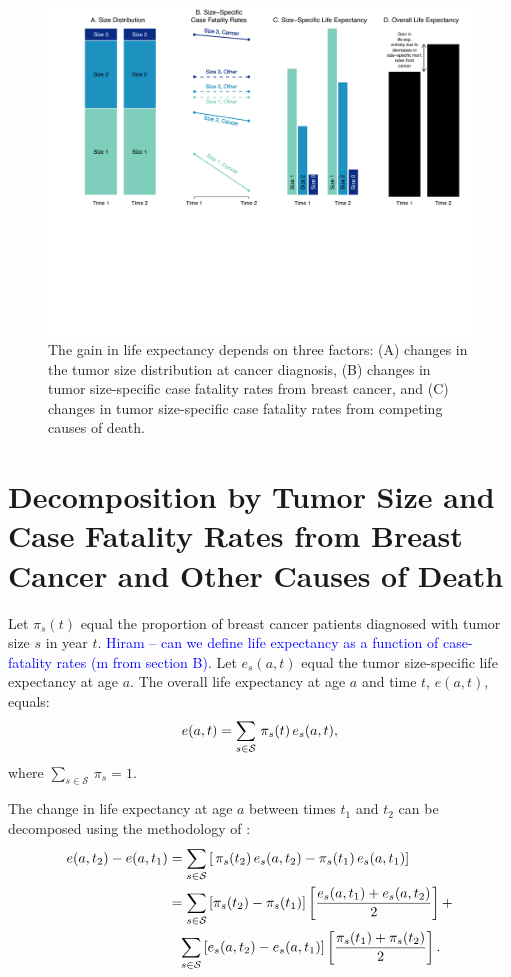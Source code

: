 \documentclass[11pt,letterpaper]{article}
\theoremstyle{plain}
\theoremstyle{remark}
\numberwithin{equation}{section}
\begin{document}
\begin{figure}[h]
\begin{center}
\includegraphics[trim=0 220 0 0,clip,width=\linewidth]{appendix_figure1}
\caption{The gain in life expectancy depends
  on three factors: (A) changes in the tumor size distribution at
  cancer diagnosis, (B) changes in tumor size-specific case fatality rates from
  breast cancer, and (C) changes in tumor size-specific case fatality rates from
  competing causes of death.}
\label{fig:simple_case}
\end{center}
\end{figure}

\section{Decomposition by Tumor Size and Case Fatality Rates from
  Breast Cancer and Other Causes of Death}
Let $\pi_s(t)$ equal the proportion of breast cancer patients
diagnosed with tumor size $s$ in year $t$.  \textcolor{blue}{Hiram --
  can we define life expectancy as a function of case-fatality rates
  (m from section B)}.  Let $e_s(a,t)$ equal the
tumor size-specific life expectancy at age $a$. The overall life
expectancy at age $a$ and time $t$, $e(a,t)$, equals:
\begin{eqnarray}
  e(a,t)=\sum_{s\in\mathcal{S}}\,\pi_s(t)\,e_s(a,t), \notag
\end{eqnarray}
where $\sum_{s\in\mathcal{S}}\,\pi_s=1$. 

The change in life expectancy at age $a$ between times $t_1$ and $t_2$
can be decomposed using the methodology of \cite{Kitagawa55}:
\begin{align}
  e(a,t_2)-e(a,t_1)&=\sum_{s\in\mathcal{S}}\left[\,\pi_s(t_2)\,e_s(a,t_2)- \pi_s(t_1)\,e_s(a,t_1)\right]  \notag\\
  \hspace{-0.7in} &=\sum_{s\in\mathcal{S}}\left[\pi_s(t_2)-\pi_s(t_1)
  \right]\left[\frac{e_s(a,t_1)+e_s(a,t_2)}{2}\right]+ \notag\\
  &\phantom{=}\sum_{s\in\mathcal{S}}\left[e_s(a,t_2)-e_s(a,t_1)
  \right]\left[\frac{\pi_s(t_1)+\pi_s(t_2)}{2}\right].
 \label{eqn:decomp.basic}
\end{align}
 
\end{document}
